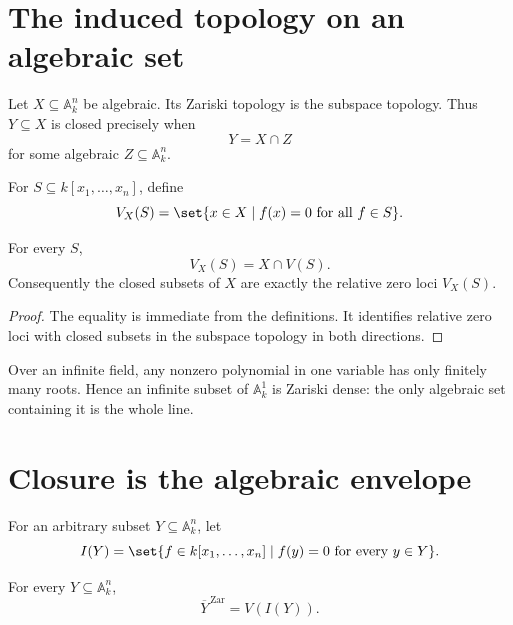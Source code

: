 \section{The induced topology on an algebraic set}
\label{sec:vi02-subspace}

Let \(X\subseteq\mathbb A_k^n\) be algebraic.  Its Zariski topology is the subspace
topology.  Thus \(Y\subseteq X\) is closed precisely when
\[
Y=X\cap Z
\]
for some algebraic \(Z\subseteq\mathbb A_k^n\).

\begin{definition}
For \(S\subseteq k[x_1,\dots,x_n]\), define
\[
V_X(S)=\set{x\in X\mid f(x)=0\text{ for all }f\in S}.
\]
\end{definition}

\begin{proposition}
\label{prop:vi02-relative-zero}
For every \(S\),
\[
V_X(S)=X\cap V(S).
\]
Consequently the closed subsets of \(X\) are exactly the relative zero loci \(V_X(S)\).
\end{proposition}

\begin{proof}
The equality is immediate from the definitions.  It identifies relative zero loci with
closed subsets in the subspace topology in both directions.
\end{proof}

\begin{example}\label{ex:vi02-expand-01}
Over an infinite field, any nonzero polynomial in one variable has only finitely many roots.  Hence an infinite subset of $\mathbb A^1_k$ is Zariski dense: the only algebraic set containing it is the whole line.
\end{example}
\section{Closure is the algebraic envelope}
\label{sec:vi02-closure}

For an arbitrary subset \(Y\subseteq\mathbb A_k^n\), let
\[
I(Y)=\set{f\in k[x_1,\dots,x_n]\mid f(y)=0\text{ for every }y\in Y}.
\]

\begin{theorem}
\label{thm:vi02-closure-formula}
For every \(Y\subseteq\mathbb A_k^n\),
\[
\overline{Y}^{\,\mathrm{Zar}}=V(I(Y)).
\]
\end{theorem}

